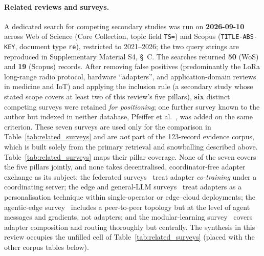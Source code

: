 \paragraph{Related reviews and surveys.}
A dedicated search for competing secondary studies was run on \textbf{2026-09-10}
across Web of Science (Core Collection, topic field \texttt{TS=}) and Scopus
(\texttt{TITLE-ABS-KEY}, document type \texttt{re}), restricted to 2021--2026;
the two query strings are reproduced in Supplementary Material S4, \S~C. The
searches returned \textbf{50} (WoS) and \textbf{19} (Scopus) records. After
removing false positives (predominantly the LoRa long-range radio protocol,
hardware ``adapters'', and application-domain reviews in medicine and IoT)
and applying the inclusion rule (a secondary study whose stated scope covers at
least two of this review's five pillars), \textbf{six} distinct competing
surveys were retained \emph{for positioning}; one further survey known to the
author but indexed in neither database, Pfeiffer et
al.~\cite{PfeifferModular2023}, was added on the same criterion. These seven
surveys are used only for the comparison in Table~\ref{tab:related_surveys} and
are \emph{not} part of the 123-record evidence corpus, which is built solely
from the primary retrieval and snowballing described above.
Table~\ref{tab:related_surveys} maps their pillar coverage.
None of the seven covers the five pillars jointly, and none takes
decentralised, coordinator-free adapter exchange as its subject: the federated
surveys~\cite{WoisetschlagerFLsurvey2024,YangFedLoRAsurvey2025} treat adapter
\emph{co-training} under a coordinating server; the edge and general-LLM
surveys~\cite{JiangEdgeLLM2026,LukacLLMsurvey2026} treat adapters as a
personalisation technique within single-operator or edge--cloud deployments;
the agentic-edge survey~\cite{DibAgenticEdge2026} includes a peer-to-peer
topology but at the level of agent messages and gradients, not adapters; and
the modular-learning survey~\cite{PfeifferModular2023} covers adapter
composition and routing thoroughly but centrally. The synthesis in this review
occupies the unfilled cell of Table~\ref{tab:related_surveys} (placed with the
other corpus tables below).

